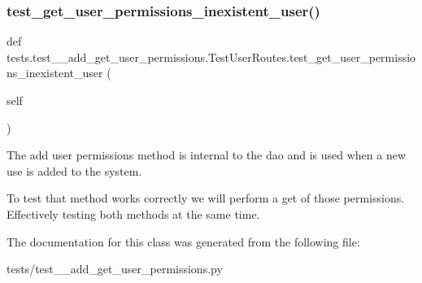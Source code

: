 \subsubsection{\texorpdfstring{test\+\_\+get\+\_\+user\+\_\+permissions\+\_\+inexistent\+\_\+user()}{test\_get\_user\_permissions\_inexistent\_user()}}
{\footnotesize\ttfamily def tests.\+test\+\_\+\_\+add\+\_\+get\+\_\+user\+\_\+permissions.\+Test\+User\+Routes.\+test\+\_\+get\+\_\+user\+\_\+permissions\+\_\+inexistent\+\_\+user (\begin{DoxyParamCaption}\item[{}]{self }\end{DoxyParamCaption})}



The add user permissions method is internal to the dao and is used when a new use is added to the system. 

To test that method works correctly we will perform a get of those permissions. Effectively testing both methods at the same time. 

The documentation for this class was generated from the following file\+:\begin{DoxyCompactItemize}
\item 
tests/test\+\_\+\_\+add\+\_\+get\+\_\+user\+\_\+permissions.\+py\end{DoxyCompactItemize}
